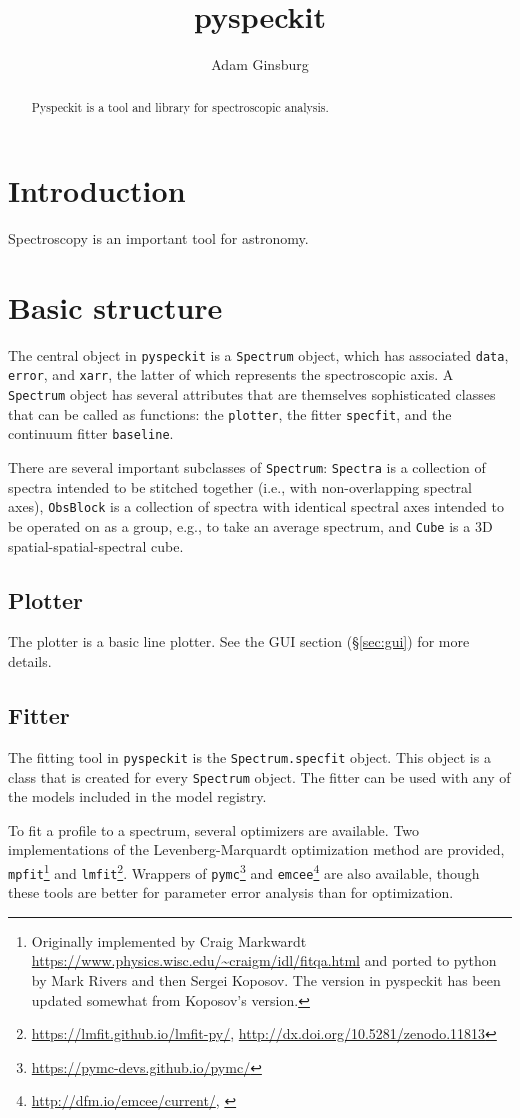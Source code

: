 \documentclass[twocolumn]{aastex61}
\newcommand{\pyspeckit}{\texttt{pyspeckit}\xspace}
\begin{document}
\title{pyspeckit}

\author[0000-0001-6431-9633]{Adam Ginsburg}
\nraojansky


\begin{abstract}
Pyspeckit is a tool and library for spectroscopic analysis. 
\end{abstract}


\section{Introduction}
Spectroscopy is an important tool for astronomy.

\section{Basic structure}
The central object in \pyspeckit is a \texttt{Spectrum} object, which has
associated \texttt{data}, \texttt{error}, and \texttt{xarr}, the latter of
which represents the spectroscopic axis.  A \texttt{Spectrum} object has
several attributes that are themselves sophisticated classes that can be called
as functions: the \texttt{plotter}, the fitter \texttt{specfit}, and the
continuum fitter \texttt{baseline}.

There are several important subclasses of \texttt{Spectrum}: \texttt{Spectra}
is a collection of spectra intended to be stitched together (i.e., with
non-overlapping spectral axes), \texttt{ObsBlock} is a collection of spectra
with identical spectral axes intended to be operated on as a group, e.g., to
take an average spectrum, and \texttt{Cube} is a 3D spatial-spatial-spectral
cube.

\subsection{Plotter}
The plotter is a basic line plotter.  See the GUI section (\S \ref{sec:gui})
for more details.

\subsection{Fitter}
The fitting tool in \pyspeckit is the \texttt{Spectrum.specfit} object.
This object is a class that is created for every \texttt{Spectrum} object.
The fitter can be used with any of the models included in the model
registry.

To fit a profile to a spectrum, several optimizers are available.  Two
implementations of the Levenberg-Marquardt optimization method are provided,
\texttt{mpfit}\footnote{Originally implemented by Craig Markwardt
\url{https://www.physics.wisc.edu/~craigm/idl/fitqa.html} and ported to python
by Mark Rivers and then Sergei Koposov.  The version in pyspeckit has been
updated somewhat from Koposov's version.} and
\texttt{lmfit}\footnote{\url{https://lmfit.github.io/lmfit-py/},
\url{http://dx.doi.org/10.5281/zenodo.11813}}.  Wrappers of
\texttt{pymc}\footnote{\url{https://pymc-devs.github.io/pymc/}} and
\texttt{emcee}\footnote{\url{http://dfm.io/emcee/current/},
\citet{Foreman-Mackey2013a}} are also available, though these tools are better
for parameter error analysis than for optimization.
\end{document}
